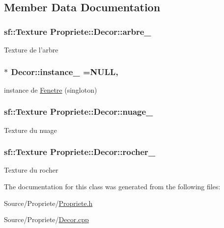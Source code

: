 \subsection{Member Data Documentation}
\hypertarget{classPropriete_1_1Decor_a0caebcbb0786093a5b670e43e5a47bfa}{
\subsubsection[{arbre\-\_\-}]{\setlength{\rightskip}{0pt plus 5cm}sf\-::\-Texture Propriete\-::\-Decor\-::arbre\-\_\-\hspace{0.3cm}{\ttfamily [private]}}}\label{classPropriete_1_1Decor_a0caebcbb0786093a5b670e43e5a47bfa}
Texture de l'arbre \hypertarget{classPropriete_1_1Decor_acedb36817f7e728a7b021ac18b4822c2}{
\subsubsection[{instance\-\_\-}]{ $\ast$ Decor\-::instance\-\_\- =N\-U\-L\-L\hspace{0.3cm}{\ttfamily [static]}, {\ttfamily [private]}}}\label{classPropriete_1_1Decor_acedb36817f7e728a7b021ac18b4822c2}
instance de \hyperlink{classPropriete_1_1Fenetre}{Fenetre} (singloton) \hypertarget{classPropriete_1_1Decor_aaf696e43073691f2d5bd9d6cd76c0b23}{
\subsubsection[{nuage\-\_\-}]{\setlength{\rightskip}{0pt plus 5cm}sf\-::\-Texture Propriete\-::\-Decor\-::nuage\-\_\-\hspace{0.3cm}{\ttfamily [private]}}}\label{classPropriete_1_1Decor_aaf696e43073691f2d5bd9d6cd76c0b23}
Texture du nuage \hypertarget{classPropriete_1_1Decor_a521c46f8d6af9e7a5ba0d579d412f326}{
\subsubsection[{rocher\-\_\-}]{\setlength{\rightskip}{0pt plus 5cm}sf\-::\-Texture Propriete\-::\-Decor\-::rocher\-\_\-\hspace{0.3cm}{\ttfamily [private]}}}\label{classPropriete_1_1Decor_a521c46f8d6af9e7a5ba0d579d412f326}
Texture du rocher 

The documentation for this class was generated from the following files\-:\begin{DoxyCompactItemize}
\item 
Source/\-Propriete/\hyperlink{Propriete_8h}{Propriete.\-h}\item 
Source/\-Propriete/\hyperlink{Propriete_2Decor_8cpp}{Decor.\-cpp}\end{DoxyCompactItemize}

